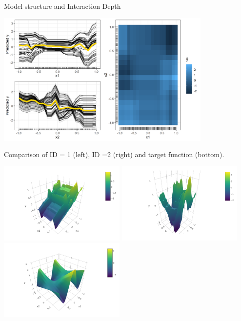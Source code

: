 \begin{vbframe}{Model structure and Interaction Depth}
\begin{center}
\includegraphics[width=0.8\textwidth]{figure_man/boosting_interaction_example_ID2.PNG}
\end{center}

\framebreak
Comparison of ID = 1 (left), ID =2 (right) and target function (bottom).
\begin{center}
\includegraphics[width=0.47\textwidth]{figure_man/boosting_interaction_depth1fit3D.PNG}
\includegraphics[width=0.47\textwidth]{figure_man/boosting_interaction_depth2fit3D.PNG}
\includegraphics[width=0.47\textwidth]{figure_man/boosting_interaction_targetfunction3D.PNG}
\end{center}

\end{vbframe}
